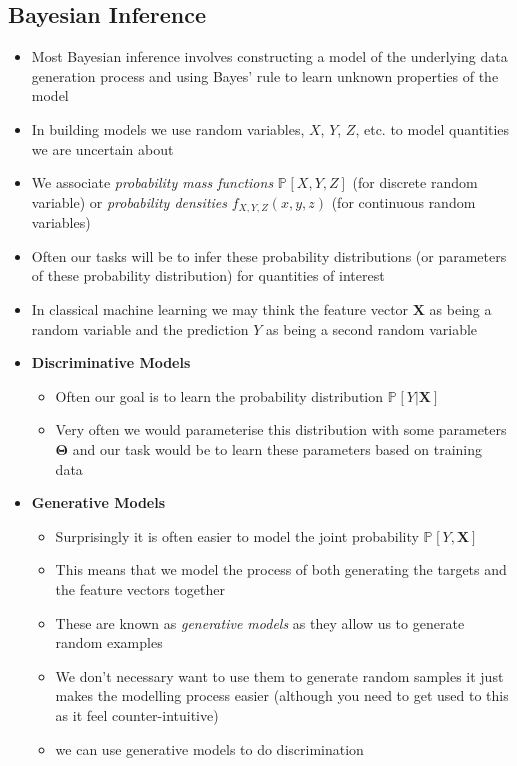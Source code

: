 \documentclass[11pt]{article}
\newcommand{\Prob}[2][]{\mathbb{P}_{#1\!}\left[ #2 \right]}
\begin{document}
\subsection{Bayesian Inference}
\label{sec:orga60037f}
\begin{itemize}
\item Most Bayesian inference involves constructing a model of the
underlying data generation process and  using Bayes' rule to
learn unknown properties of the model
\item In building models we use random variables, \(X\), \(Y\), \(Z\),
etc. to model quantities we are uncertain about
\item We associate \emph{probability mass functions} \(\Prob{X,Y,Z}\) (for
discrete random variable) or \emph{probability densities}
\(f_{X,Y,Z}(x,y,z)\) (for continuous random variables)
\item Often our tasks will be to infer these probability distributions
(or parameters of these probability distribution) for quantities
of interest
\item In classical machine learning we may think the feature vector
\(\bm{X}\) as being a random variable and the prediction \(Y\) as
being a second random variable
\item \textbf{Discriminative Models}
\begin{itemize}
\item Often our goal is to learn the probability distribution \(\Prob{Y|\bm{X}}\)
\item Very often we would parameterise this distribution with some
parameters \(\bm{\Theta}\) and our task would be to learn these
parameters based on training data
\end{itemize}
\item \textbf{Generative Models}
\begin{itemize}
\item Surprisingly it is  often easier to model the joint probability
\(\Prob{Y,\bm{X}}\)
\item This means that we model the process of both generating the
targets and the feature vectors together
\item These are known as \emph{generative models} as they allow us to
generate random examples
\item We don't necessary want to use them to generate random samples
it just makes the modelling process easier (although you need
to get used to this as it feel counter-intuitive)
\item we can use generative models to do discrimination

\end{itemize}
\end{itemize}
\end{document}
